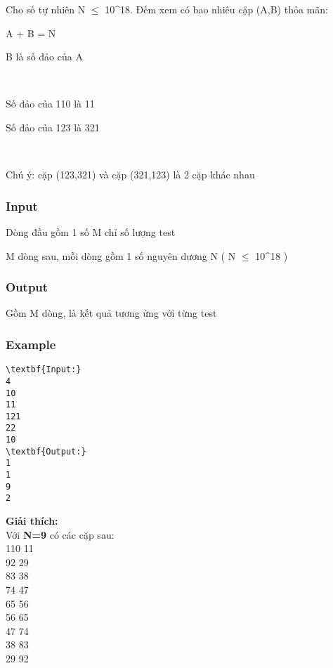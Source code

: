 

Cho số tự nhiên N  $\le$  10\textasciicircum18. Đếm xem có bao nhiêu cặp (A,B) thỏa mãn:

A + B = N

B là số đảo của A

 

Số đảo của 110 là 11

Số đảo của 123 là 321

 

Chú ý: cặp (123,321) và cặp (321,123) là 2 cặp khác nhau

\subsubsection{Input}

Dòng đầu gồm 1 số M chỉ số lượng test

M dòng sau, mỗi dòng gồm 1 số nguyên dương N ( N  $\le$  10\textasciicircum18 )

\subsubsection{Output}

Gồm M dòng, là kết quả tương ứng với từng test

\subsubsection{Example}
\begin{verbatim}
\textbf{Input:}
4
10
11
121
22
10
\textbf{Output:}
1
1
9
2\end{verbatim}

\textbf{Giải thích:}
\\Với\textbf{ N=9} có các cặp sau:
\\110 11
\\92 29
\\83 38
\\74 47
\\65 56
\\56 65
\\47 74
\\38 83
\\29 92

 
